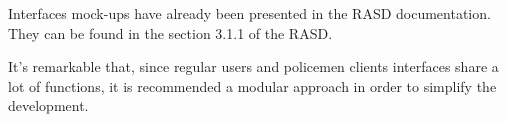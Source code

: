 Interfaces mock-ups have already been presented in the RASD documentation.
They can be found in the section 3.1.1 of the RASD. \par
It's remarkable that, since regular users and policemen clients interfaces share a lot of functions, it is recommended a modular approach in order to simplify the development.